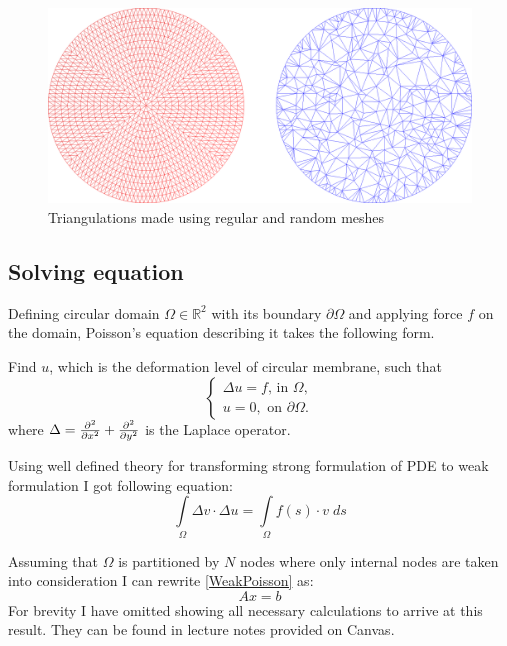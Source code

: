 \documentclass[a4,10pt]{article}
\newcommand{\Int}{\int\limits}
\begin{document}
\begin{figure}[H]
  \centering
  \includegraphics[width=.75\textwidth]{Triangulation}
  \caption{Triangulations made using regular and random meshes}\label{Meshes}
\end{figure}

\subsection{Solving equation}

Defining circular domain $\Omega \in \mathbb{R}^2$ with its boundary  $\partial \Omega$ and applying force $f$ on the domain, Poisson's equation describing it takes the following form.

Find $u$, which is the deformation level of circular membrane, such that
\begin{equation} \label{StrongPoisson}
\left\{
\begin{array}{rll} 
\Delta u = f \text{, in } \Omega, \\
u = 0, \text{ on } \partial \Omega.
\end{array} \right.
\end{equation}
where $\Delta = \pdv[2]{}{x} + \pdv[2]{}{y}$ is the Laplace operator.

Using well defined theory for transforming strong formulation of PDE to weak formulation I got following equation:
\begin{equation} \label{WeakPoisson}
\Int_{\Omega} \Delta v \cdot \Delta u = \Int_{\Omega}f(s) \cdot v \; ds
\end{equation}

Assuming that $\Omega$ is partitioned by $N$ nodes where only internal nodes are taken into consideration I can rewrite \cref{WeakPoisson} as:
\begin{equation} \label{MatrixFormulation}
Ax=b
\end{equation}
For brevity I have omitted showing all necessary calculations to arrive at this result. They can be found in lecture notes provided on Canvas. \cite{Kravetc:2018}
\end{document}
